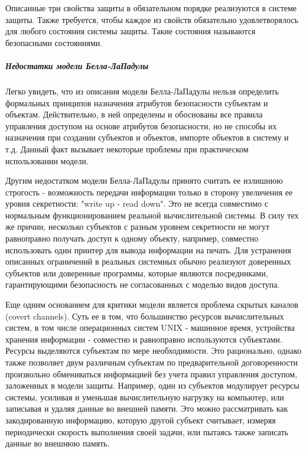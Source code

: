 Описанные три свойства защиты в обязательном порядке реализуются в системе защиты. Также требуется, чтобы каждое из свойств обязательно удовлетворялось для любого состояния системы защиты. Такие состояния называются безопасными состояниями. 


\subparagraph{Недостатки модели Белла-ЛаПадулы}

Легко увидеть, что из описания модели Белла-ЛаПадулы нельзя определить формальных принципов назначения атрибутов безопасности субъектам и объектам. Действительно, в ней определены и обоснованы все правила управления доступом на основе атрибутов безопасности, но не способы их назначения при создании субъектов и объектов, импорте объектов в систему и т.д. Данный факт вызывает некоторые проблемы при практическом использовании модели. 

Другим недостатком модели Белла-ЛаПадулы принято считать ее излишнюю строгость - возможность передачи информации только в сторону увеличения ее уровня секретности: "write up - read down". Это не всегда совместимо с нормальным функционированием реальной вычислительной системы. В силу тех же причин, несколько субъектов с разным уровнем секретности не могут равноправно получать доступ к одному объекту, например, совместно использовать один принтер для вывода информации на печать. Для устранения описанных ограничений в реальных системных обычно реализуют доверенных субъектов или доверенные программы, которые являются посредниками, гарантирующими безопасность не согласованных с моделью видов доступа. 

Еще одним основанием для критики модели является проблема скрытых каналов (covert channels). Суть ее в том, что большинство ресурсов вычислительных систем, в том числе операционных систем UNIX - машинное время, устройства хранения информации - совместно и равноправно используются субъектами. Ресурсы выделяются субъектам по мере необходимости. Это рационально, однако также позволяет двум различным субъектам по предварительной договоренности произвольно обмениваться информацией без учета правил управления доступом, заложенных в модели защиты. Например, один из субъектов модулирует ресурсы системы, усиливая и уменьшая вычислительную нагрузку на компьютер, или записывая и удаляя данные во внешней памяти. Это можно рассматривать как закодированную информацию, которую другой субъект считывает, измеряя периодически скорость выполнения своей задачи, или пытаясь также записать данные во внешнюю память. 

